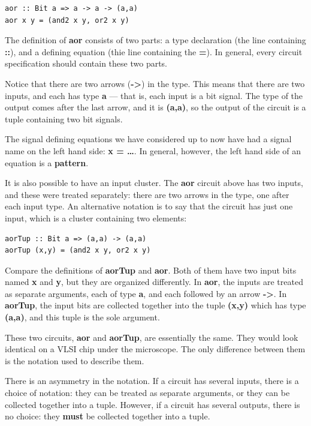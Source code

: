 \documentclass[]{svmono}
\begin{document}
\begin{verbatim}
aor :: Bit a => a -> a -> (a,a)
aor x y = (and2 x y, or2 x y)
\end{verbatim}


The definition of \textbf{aor} consists of two parts: a type declaration (the
line containing \textbf{::}), and a defining equation (thie line containing
the \textbf{=}).  In general, every circuit specification should contain
these two parts.

Notice that there are two arrows (\textbf{->}) in the type.  This means that
there are two inputs, and each has type \textbf{a} --- that is, each input is
a bit signal.  The type of the output comes after the last arrow, and
it is \textbf{(a,a)}, so the output of the circuit is a tuple containing two
bit signals.

The signal defining equations we have considered up to now have had a
signal name on the left hand side: \textbf{x = \ldots{}}.  In general, however,
the left hand side of an equation is a \textbf{pattern}.

It is also possible to have an input cluster.  The \textbf{aor} circuit above
has two inputs, and these were treated separately: there are two
arrows in the type, one after each input type.  An alternative
notation is to say that the circuit has just one input, which is a
cluster containing two elements:

\begin{verbatim}
aorTup :: Bit a => (a,a) -> (a,a)
aorTup (x,y) = (and2 x y, or2 x y)
\end{verbatim}


Compare the definitions of \textbf{aorTup} and \textbf{aor}.  Both of them have two
input bits named \textbf{x} and \textbf{y}, but they are organized differently.  In
\textbf{aor}, the inputs are treated as separate arguments, each of type \textbf{a},
and each followed by an arrow \textbf{->}.  In \textbf{aorTup}, the input bits are
collected together into the tuple \textbf{(x,y)} which has type \textbf{(a,a)}, and
this tuple is the sole argument.

These two circuits, \textbf{aor} and \textbf{aorTup}, are essentially the same.
They would look identical on a VLSI chip under the microscope.  The
only difference between them is the notation used to describe them.

There is an asymmetry in the notation.  If a circuit has several
inputs, there is a choice of notation: they can be treated as separate
arguments, or they can be collected together into a tuple.  However,
if a circuit has several outputs, there is no choice: they \textbf{must}
be collected together into a tuple.
\end{document}
